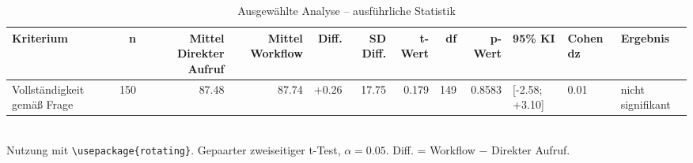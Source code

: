 \begin{table}
\centering
\caption{Ausgewählte Analyse -- ausführliche Statistik}
\begin{tabular}{lrrrrrrrrlll}
\toprule
Kriterium & n & Mittel Direkter Aufruf & Mittel Workflow & Diff. & SD Diff. & t-Wert & df & p-Wert & 95\% KI & Cohen dz & Ergebnis \\
\midrule
Vollständigkeit gemäß Frage & 150 & 87.48 & 87.74 & +0.26 & 17.75 & 0.179 & 149 & 0.8583 & [-2.58; +3.10] & 0.01 & nicht signifikant \\
\bottomrule
\end{tabular}
\\[2mm]
\footnotesize Nutzung mit \texttt{\textbackslash usepackage\{rotating\}}. Gepaarter zweiseitiger t-Test, $\alpha=0.05$. Diff. = Workflow $-$ Direkter Aufruf.
\end{table}

